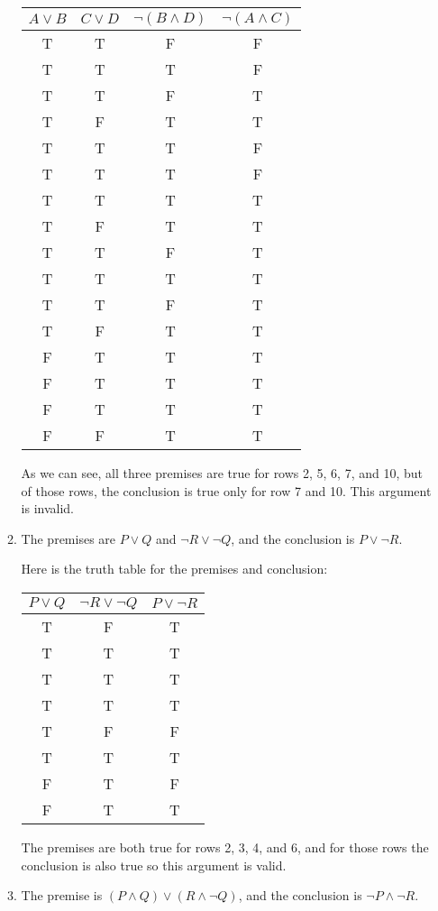 \documentclass{article}
\begin{document}
\begin{enumerate}
\begin{enumerate}
    \begin{tabular}{c c c c}
      $A \lor B$ & $C \lor D$ & $\lnot (B \land D)$ & $\lnot (A \land C)$ \\ \hline
      T & T & F & F \\
      T & T & T & F \\
      T & T & F & T \\
      T & F & T & T \\
      T & T & T & F \\
      T & T & T & F \\
      T & T & T & T \\
      T & F & T & T \\
      T & T & F & T \\
      T & T & T & T \\
      T & T & F & T \\
      T & F & T & T \\
      F & T & T & T \\
      F & T & T & T \\
      F & T & T & T \\
      F & F & T & T \\
    \end{tabular}

    As we can see, all three premises are true for rows 2, 5, 6, 7, and 10, but of those rows, the conclusion is true only for row 7 and 10.  This argument is invalid.

  \item The premises are $P \lor Q$ and $\lnot R \lor \lnot Q$, and the conclusion is $P \lor \lnot R$.

    Here is the truth table for the premises and conclusion:

    \begin{tabular}{c c c}
      $P \lor Q$ & $\lnot R \lor \lnot Q$ & $P \lor \lnot R$ \\ \hline
      T & F & T \\
      T & T & T \\
      T & T & T \\
      T & T & T \\
      T & F & F \\
      T & T & T \\
      F & T & F \\
      F & T & T \\
    \end{tabular}

    The premises are both true for rows 2, 3, 4, and 6, and for those rows the conclusion is also true so this argument is valid.
  \item
    The premise is $(P \land Q) \lor (R \land \lnot Q)$, and the conclusion is $\lnot P \land \lnot R$.


\end{enumerate}
\end{enumerate}
\end{document}
